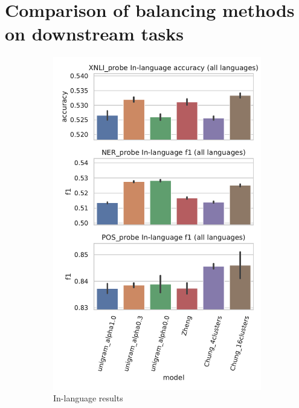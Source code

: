 \section{Comparison of balancing methods on downstream tasks}

\begin{figure}
    \centering
    \begin{subfigure}{.5\textwidth}
      \centering
      \includegraphics[width=\linewidth]{figures/probe_overall_inlanguage.pdf}
      \caption{In-language results}
      \label{fig:probe_overall_inlanguage}
    \end{subfigure}%
    \begin{subfigure}{.5\textwidth}

\end{subfigure}
\end{figure}
